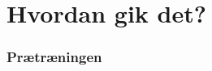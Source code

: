 \documentclass{beamer}
\begin{document}
\section{Hvordan gik det?}
\begin{frame}
    \frametitle{Prætræningen}
    \begin{figure}[H]
        \centering
    \end{figure}\noindent
\end{frame}
\end{document}
